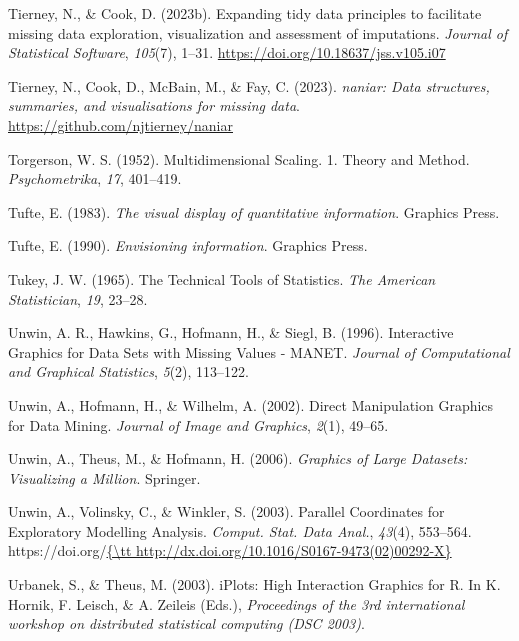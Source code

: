 \documentclass[
  letterpaper,
]{krantz}
\newlength{\cslhangindent}
\newenvironment{CSLReferences}[2] %
 {\begin{list}{}{%
  \setlength{\itemindent}{0pt}
  \setlength{\leftmargin}{0pt}
  \setlength{\parsep}{0pt}
  \ifodd #1
   \setlength{\leftmargin}{\cslhangindent}
   \setlength{\itemindent}{-1\cslhangindent}
  \fi
  \setlength{\itemsep}{#2\baselineskip}}}
 {\end{list}}
\begin{document}
\begin{CSLReferences}{1}{0}
Tierney, N., \& Cook, D. (2023b). Expanding tidy data principles to
facilitate missing data exploration, visualization and assessment of
imputations. \emph{Journal of Statistical Software}, \emph{105}(7),
1--31. \url{https://doi.org/10.18637/jss.v105.i07}

Tierney, N., Cook, D., McBain, M., \& Fay, C. (2023). \emph{{naniar}:
Data structures, summaries, and visualisations for missing data}.
\url{https://github.com/njtierney/naniar}

Torgerson, W. S. (1952). Multidimensional {S}caling. 1. {T}heory and
{M}ethod. \emph{Psychometrika}, \emph{17}, 401--419.

Tufte, E. (1983). \emph{The visual display of quantitative information}.
Graphics Press.

Tufte, E. (1990). \emph{Envisioning information}. Graphics Press.

Tukey, J. W. (1965). The {T}echnical {T}ools of {S}tatistics. \emph{The
American Statistician}, \emph{19}, 23--28.

Unwin, A. R., Hawkins, G., Hofmann, H., \& Siegl, B. (1996).
{I}nteractive {G}raphics for {D}ata {S}ets with {M}issing {V}alues -
{MANET}. \emph{Journal of Computational and Graphical Statistics},
\emph{5}(2), 113--122.

Unwin, A., Hofmann, H., \& Wilhelm, A. (2002). Direct {M}anipulation
{G}raphics for {D}ata {M}ining. \emph{Journal of Image and Graphics},
\emph{2}(1), 49--65.

Unwin, A., Theus, M., \& Hofmann, H. (2006). \emph{Graphics of {L}arge
{D}atasets: {V}isualizing a {M}illion}. Springer.

Unwin, A., Volinsky, C., \& Winkler, S. (2003). Parallel {C}oordinates
for {E}xploratory {M}odelling {A}nalysis. \emph{Comput. Stat. Data
Anal.}, \emph{43}(4), 553--564.
https://doi.org/\href{\%7B/tt\%20http://dx.doi.org/10.1016/S0167-9473(02)00292-X\%7D}{\{\textbackslash tt
http://dx.doi.org/10.1016/S0167-9473(02)00292-X\}}

Urbanek, S., \& Theus, M. (2003). {iPlots}: {H}igh {I}nteraction
{G}raphics for {R}. In K. Hornik, F. Leisch, \& A. Zeileis (Eds.),
\emph{Proceedings of the 3rd international workshop on distributed
statistical computing (DSC 2003)}.


\end{CSLReferences}
\end{document}
